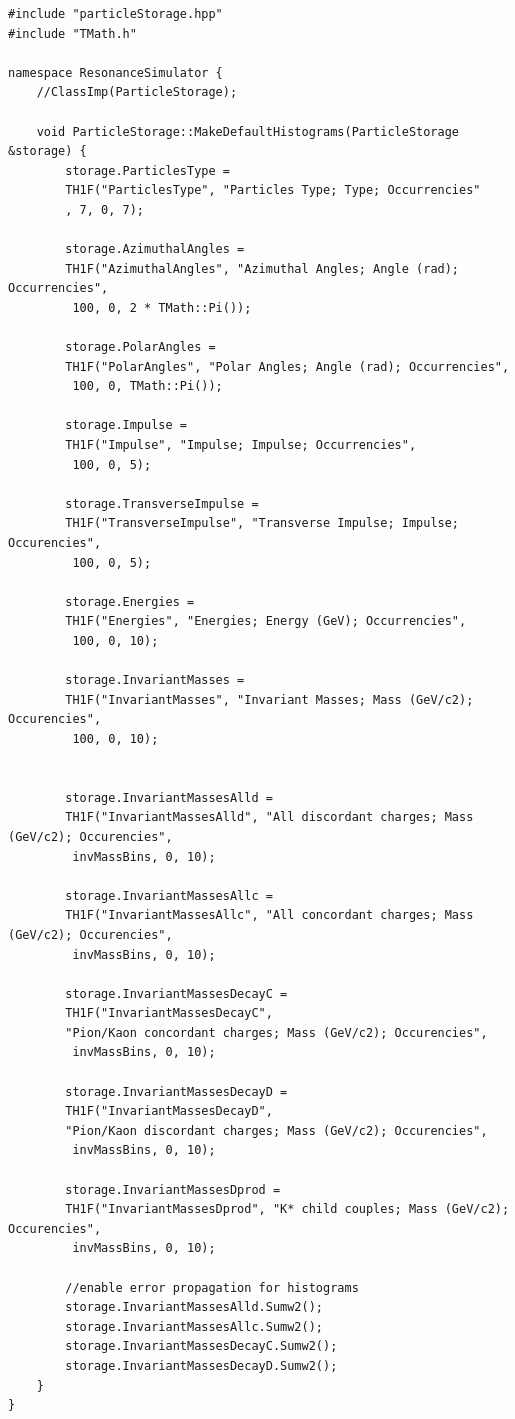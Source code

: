 \documentclass[12pt, a4paper]{article}
\begin{document}
\begin{verbatim}
#include "particleStorage.hpp"
#include "TMath.h"

namespace ResonanceSimulator {
    //ClassImp(ParticleStorage);
    
    void ParticleStorage::MakeDefaultHistograms(ParticleStorage &storage) {
        storage.ParticlesType = 
        TH1F("ParticlesType", "Particles Type; Type; Occurrencies"
        , 7, 0, 7);
        
        storage.AzimuthalAngles = 
        TH1F("AzimuthalAngles", "Azimuthal Angles; Angle (rad); Occurrencies",
         100, 0, 2 * TMath::Pi());
        
        storage.PolarAngles = 
        TH1F("PolarAngles", "Polar Angles; Angle (rad); Occurrencies",
         100, 0, TMath::Pi());
        
        storage.Impulse = 
        TH1F("Impulse", "Impulse; Impulse; Occurrencies",
         100, 0, 5);
        
        storage.TransverseImpulse = 
        TH1F("TransverseImpulse", "Transverse Impulse; Impulse; Occurencies",
         100, 0, 5);
        
        storage.Energies = 
        TH1F("Energies", "Energies; Energy (GeV); Occurrencies",
         100, 0, 10);
        
        storage.InvariantMasses = 
        TH1F("InvariantMasses", "Invariant Masses; Mass (GeV/c2); Occurencies",
         100, 0, 10);
        

        storage.InvariantMassesAlld = 
        TH1F("InvariantMassesAlld", "All discordant charges; Mass (GeV/c2); Occurencies",
         invMassBins, 0, 10);
        
        storage.InvariantMassesAllc = 
        TH1F("InvariantMassesAllc", "All concordant charges; Mass (GeV/c2); Occurencies",
         invMassBins, 0, 10);
        
        storage.InvariantMassesDecayC = 
        TH1F("InvariantMassesDecayC", 
        "Pion/Kaon concordant charges; Mass (GeV/c2); Occurencies",
         invMassBins, 0, 10);
        
        storage.InvariantMassesDecayD = 
        TH1F("InvariantMassesDecayD", 
        "Pion/Kaon discordant charges; Mass (GeV/c2); Occurencies",
         invMassBins, 0, 10);
        
        storage.InvariantMassesDprod = 
        TH1F("InvariantMassesDprod", "K* child couples; Mass (GeV/c2); Occurencies",
         invMassBins, 0, 10);

        //enable error propagation for histograms
        storage.InvariantMassesAlld.Sumw2();
        storage.InvariantMassesAllc.Sumw2();
        storage.InvariantMassesDecayC.Sumw2();
        storage.InvariantMassesDecayD.Sumw2();
    }
}
\end{verbatim}
\end{document}
